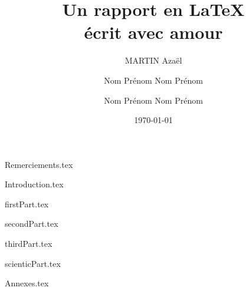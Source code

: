 \documentclass{rUTT}
\title{Un rapport en \LaTeX \\ écrit avec amour}
\date{\today}
\author{
    {\sc MARTIN} Azaël
    \and
    {\sc Nom} Prénom
    \break
    {\sc Nom} Prénom
    \and
    {\sc Nom} Prénom
    \break
    {\sc Nom} Prénom
    }
\begin{document}

    \frontpagereports %

    \justifying

    {Remerciements.tex} %

    \clearpage




    \clearpage


    {Introduction.tex}

    \clearpage

    {firstPart.tex}

    \clearpage

    {secondPart.tex}

    \clearpage

    {thirdPart.tex}

    \clearpage

    {scienticPart.tex}

    \clearpage

    \tripleS

    {Annexes.tex}

    \clearpage


    {
    \raggedright %
    \sloppy
    \nocite{*} %
    \printbibliography[title={Bibliographie},heading=bibintoc]

    \clearpage

    \listoffigures
    \listoftables
    }

    \clearpage
    \thispagestyle{empty}
    \setcounter{tocdepth}{10} %
    \tableofcontents
    
    \clearpage
    \myemptypage
\end{document}
